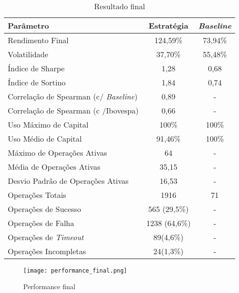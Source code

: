 \begin{table}[h!] %
    \begin{center}
        \begin{tabular}{ l|c|c }
            Parâmetro & Estratégia & \textit{Baseline} \\
            \hline
            Rendimento Final & 124,59\% & 73,94\% \\
            Volatilidade & 37,70\% & 55,48\% \\
            Índice de Sharpe & 1,28 & 0,68 \\
            Índice de Sortino & 1,84 & 0,74 \\
            Correlação de Spearman (c/ \textit{Baseline}) & 0,89 & - \\
            Correlação de Spearman (c /Ibovespa) & 0,66 & - \\
            Uso Máximo de Capital & 100\% & 100\% \\
            Uso Médio de Capital & 91,46\% & 100\% \\
            Máximo de Operações Ativas & 64 & - \\
            Média de Operações Ativas & 35,15 & - \\
            Desvio Padrão de Operações Ativas & 16,53 & -\\
            Operações Totais & 1916 & 71 \\
            Operações de Sucesso & 565 (29,5\%) & - \\
            Operações de Falha & 1238 (64,6\%) & - \\
            Operações de \textit{Timeout} & 89(4,6\%) & - \\
            Operações Incompletas & 24(1,3\%) & - \\
        \end{tabular}
        \caption{Resultado final}
        \label{tab:13}
    \end{center}
\end{table}

\begin{figure}[!htb]
    \texttt{[image: performance\_final.png]}
    \centering
    \caption{Performance final}
    \label{fig:250}
\end{figure}
